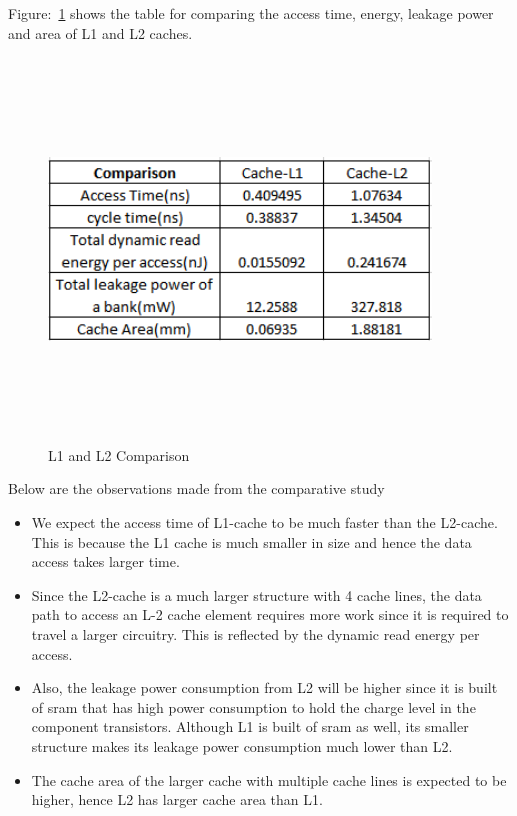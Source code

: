 \documentclass{tufte-handout}
\begin{document}
		Figure:~\ref{fig:L1L2Compare} shows the table for comparing the access time, energy, leakage power and area of L1 and L2 caches.
		\begin{figure}[h!]
		\label{fig:L1L2Compare}
		\centering
		\includegraphics[width = 4in, height = 4in]{L1L2Compare}
		\caption{L1 and L2 Comparison }
		\end{figure}

		Below are the observations made from the comparative study
		\begin{itemize}
			\item We expect the access time of L1-cache to be much faster than the L2-cache. This is because the L1 cache is much smaller in size and hence the data access takes larger time.
			\item Since the L2-cache is a much larger structure with 4 cache lines, the data path to access an  L-2 cache element requires more work since it is required to travel a larger circuitry. This is reflected by the dynamic read energy per access.
			\item Also, the leakage power consumption from L2 will be higher since it is built of sram that has high power consumption to hold the charge level in the component transistors. Although L1 is built of sram as well, its smaller structure makes its leakage power consumption much lower than L2.
			\item The cache area of the larger cache with multiple cache lines is expected to be higher, hence L2 has larger cache area than L1.
		\end{itemize}
\end{document}
